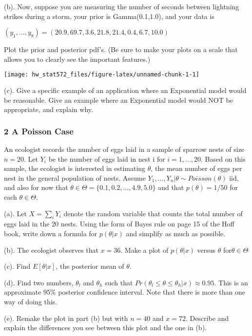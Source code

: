 \documentclass[]{article}
\begin{document}
(b). Now, suppose you are measuring the number of seconds between
lightning strikes during a storm, your prior is Gamma(0.1,1.0), and your
data is

\((y_1,...,y_8) = (20.9,69.7,3.6,21.8,21.4,0.4,6.7,10.0)\)

Plot the prior and posterior pdf's. (Be sure to make your plots on a
scale that allows you to clearly see the important features.)

\begin{center}\texttt{[image: hw\_stat572\_files/figure-latex/unnamed-chunk-1-1]} \end{center}

(c). Give a specific example of an application where an Exponential
model would be reasonable. Give an example where an Exponential model
would NOT be appropriate, and explain why.

\hypertarget{a-poisson-case}{%
\subsubsection{2 A Poisson Case}\label{a-poisson-case}}

An ecologist records the number of eggs laid in a sample of sparrow
nests of size \(n=20\). Let \(Y_i\) be the number of eggs laid in nest i
for \(i=1,...,20\). Based on this sample, the ecologist is interested in
estimating \(\theta\), the mean number of eggs per nest in the general
population of nests. Assume \(Y_1,...,Y_n|\theta\sim Poisson(\theta)\)
iid, and also for now that \(\theta\in\Theta=\{0.1,0.2,...,4.9,5.0\}\)
and that \(p(\theta) = 1/50\) for each \(\theta\in\Theta\).

(a). Let \(X=\sum_i Y_i\) denote the random variable that counts the
total number of eggs laid in the 20 nests. Using the form of Bayes rule
on page 15 of the Hoff book, write down a formula for \(p(\theta|x)\)
and simplify as much as possible.

(b). The ecologist observes that \(x = 36\). Make a plot of
\(p(\theta|x)\) versus \(\theta\) for\(\theta\in\Theta\)

(c). Find \(E[\theta|x]\), the posterior mean of \(\theta\).

(d). Find two numbers, \(\theta_l\) and \(\theta_h\) such that
\(Pr(\theta_l\le\theta\le\theta_h|x)\approx 0.95\). This is an
approximate 95\% posterior confidence interval. Note that there is more
than one way of doing this.

(e). Remake the plot in part (b) but with \(n = 40\) and \(x = 72\).
Describe and explain the differences you see between this plot and the
one in (b).
\end{document}

